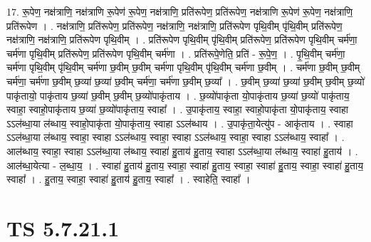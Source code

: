 \documentclass[17pt]{extarticle}
\begin{document}
17. रू॒पेण॒ नक्ष॑त्राणि॒ नक्ष॑त्राणि रू॒पेण॑ रू॒पेण॒ नक्ष॑त्राणि॒ प्रति॑रूपेण॒ प्रति॑रूपेण॒ नक्ष॑त्राणि रू॒पेण॑ रू॒पेण॒ नक्ष॑त्राणि॒ प्रति॑रूपेण । . नक्ष॑त्राणि॒ प्रति॑रूपेण॒ प्रति॑रूपेण॒ नक्ष॑त्राणि॒ नक्ष॑त्राणि॒ प्रति॑रूपेण पृथि॒वीम् पृ॑थि॒वीम् प्रति॑रूपेण॒ नक्ष॑त्राणि॒ नक्ष॑त्राणि॒ प्रति॑रूपेण पृथि॒वीम् । . प्रति॑रूपेण पृथि॒वीम् पृ॑थि॒वीम् प्रति॑रूपेण॒ प्रति॑रूपेण पृथि॒वीम् चर्म॑णा॒ चर्म॑णा पृथि॒वीम् प्रति॑रूपेण॒ प्रति॑रूपेण पृथि॒वीम् चर्म॑णा । . प्रति॑रूपे॒णेति॒ प्रति॑ - रू॒पे॒ण॒ । . पृ॒थि॒वीम् चर्म॑णा॒ चर्म॑णा पृथि॒वीम् पृ॑थि॒वीम् चर्म॑णा छ॒वीम् छ॒वीम् चर्म॑णा पृथि॒वीम् पृ॑थि॒वीम् चर्म॑णा छ॒वीम् । . चर्म॑णा छ॒वीम् छ॒वीम् चर्म॑णा॒ चर्म॑णा छ॒वीम् छ॒व्या॑ छ॒व्या॑ छ॒वीम् चर्म॑णा॒ चर्म॑णा छ॒वीम् छ॒व्या᳚ । . छ॒वीम् छ॒व्या॑ छ॒व्या॑ छ॒वीम् छ॒वीम् छ॒व्यो॑ पाकृ॑तायो॒ पाकृ॑ताय छ॒व्या॑ छ॒वीम् छ॒वीम् छ॒व्यो॑पाकृ॑ताय । . छ॒व्यो॑पाकृ॑ता यो॒पाकृ॑ताय छ॒व्या॑ छ॒व्यो॑ पाकृ॑ताय॒ स्वाहा॒ स्वाहो॒पाकृ॑ताय छ॒व्या॑ 
छ॒व्यो॑पाकृ॑ताय॒ स्वाहा᳚ । . उ॒पाकृ॑ताय॒ स्वाहा॒ स्वाहो॒पाकृ॑ता यो॒पाकृ॑ताय॒ स्वाहा ऽऽल॑ब्धा॒या ल॑ब्धाय॒ स्वाहो॒पाकृ॑ता
यो॒पाकृ॑ताय॒ स्वाहा ऽऽल॑ब्धाय । . उ॒पाकृ॑ता॒येत्यु॑प - आकृ॑ताय । . स्वाहा ऽऽल॑ब्धा॒या ल॑ब्धाय॒ स्वाहा॒ स्वाहा ऽऽल॑ब्धाय॒ स्वाहा॒ स्वाहा ऽऽल॑ब्धाय॒ स्वाहा॒ स्वाहा ऽऽल॑ब्धाय॒ स्वाहा᳚ । . आल॑ब्धाय॒ स्वाहा॒ स्वाहा ऽऽल॑ब्धा॒या ल॑ब्धाय॒ स्वाहा॑ हु॒ताय॑ हु॒ताय॒ स्वाहा ऽऽल॑ब्धा॒या ल॑ब्धाय॒ स्वाहा॑ हु॒ताय॑ । . आल॑ब्धा॒येत्या - ल॒ब्धा॒य॒ । . स्वाहा॑ हु॒ताय॑ हु॒ताय॒ स्वाहा॒ स्वाहा॑ हु॒ताय॒ स्वाहा॒ स्वाहा॑ हु॒ताय॒ स्वाहा॒ स्वाहा॑ हु॒ताय॒ स्वाहा᳚ । . हु॒ताय॒ स्वाहा॒ स्वाहा॑ हु॒ताय॑ हु॒ताय॒ स्वाहा᳚ । . स्वाहेति॒ स्वाहा᳚ । \newline
\pagebreak
{}

\section{ TS 5.7.21.1 }
\end{document}

